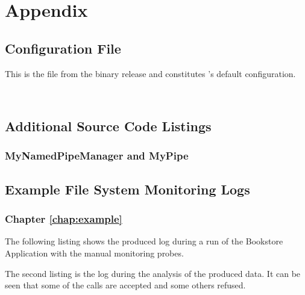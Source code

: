 % 


\appendix
\renewcommand{\thesection}{\Alph{section}} \setcounter{section}{0}
\chapter*{Appendix}
  \section{\KiekerMonitoringPart{} Configuration File}\label{sec:appdx:monitoringproperties}

This is the file \file{\monitoringPropertiesFile} from the binary release and 
constitutes \KiekerMonitoringPart{}'s default configuration.

\

\setXMLListing


\newpage


  \section{Additional Source Code Listings}
    \subsection{MyNamedPipeManager and MyPipe}
      \setJavaCodeListing
      

      \setJavaCodeListing
      

\newpage
  \section{Example File System Monitoring Logs}

	\subsection{Chapter \ref{chap:example}}
		The following listing shows the produced log during a run of the Bookstore Application with the manual monitoring probes.
		
		The second listing is the log during the analysis of the produced data. It can be seen that some of the calls are accepted and some others refused.
		
	
